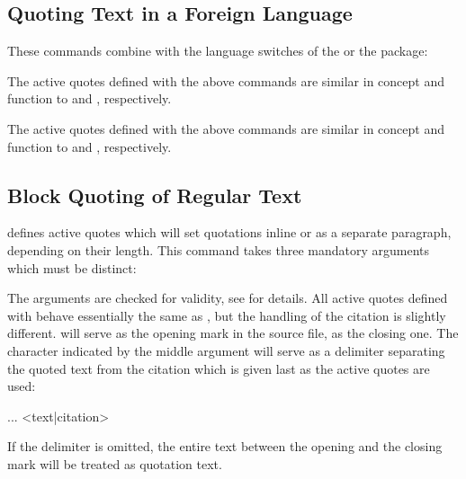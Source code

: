 \documentclass{ltxdockit}[2010/09/26]
\begin{document}
\subsection{Quoting Text in a Foreign Language}
\label{act:bbl}

These commands combine  with the language switches of the  or the  package:

\begin{ltxsyntax}


The active quotes defined with the above commands are similar in concept and function to  and , respectively.


The active quotes defined with the above commands are similar in concept and function to  and , respectively.

\end{ltxsyntax}

\subsection{Block Quoting of Regular Text}
\label{act:blk:reg}

 defines active quotes which will set quotations inline or as a separate paragraph, depending on their length. This command takes three mandatory arguments which must be distinct:

\begin{ltxsyntax}


The arguments are checked for validity, see  for details. All active quotes defined with  behave essentially the same as , but the handling of the citation is slightly different.  will serve as the opening mark in the source file,  as the closing one. The character indicated by the middle argument  will serve as a delimiter separating the quoted text from the citation which is given last as the active quotes are used:

\begin{ltxcode}
\MakeBlockQuote{<}{|}{>}
...
<text|citation>
\end{ltxcode}
%
If the delimiter is omitted, the entire text between the opening and the closing mark will be treated as quotation text.

\end{ltxsyntax}
\end{document}
